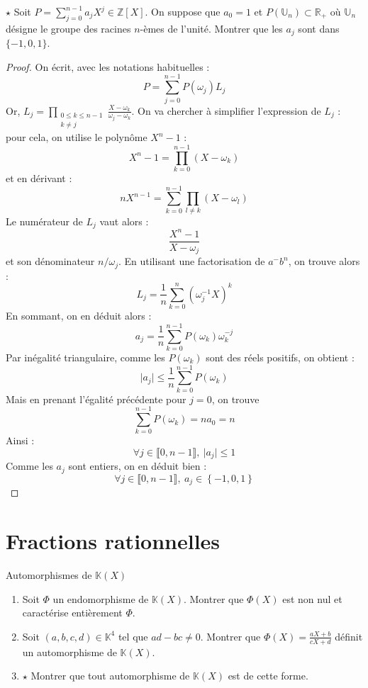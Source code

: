 \documentclass[french,a4paper]{article}
\newcommand{\Z}{\mathbb{Z}}
\newcommand{\R}{\mathbb{R}}
\newcommand{\K}{\mathbb{K}}
\newcommand{\U}{\mathbb{U}}
\newcommand{\inv}{^{-1}}
\theoremstyle{plain}
\theoremstyle{definition}
\theoremstyle{remark}
\begin{document}
\begin{ex}{$\star$}
	Soit $P=\displaystyle\sum_{j=0}^{n-1}a_jX^j\in\Z[X]$. On suppose que $a_0=1$ et $P(\U_n)\subset\R_+$ où $\U_n$ désigne le groupe des racines $n$-èmes de l'unité. Montrer que les $a_j$ sont dans $\{-1,0,1\}$.
\end{ex}
\begin{proof}
	On écrit, avec les notations habituelles : $$P=\sum_{j=0}^{n-1}P(\omega_j)L_j$$ Or, $L_j=\displaystyle\prod_{\substack{0\leqslant k\leqslant n-1\\ k\ne j}}\frac{X-\omega_k}{\omega_j-\omega_k}$. On va chercher à simplifier l'expression de $L_j$ : pour cela, on utilise le polynôme $X^n-1$ : $$X^n-1=\prod_{k=0}^{n-1}(X-\omega_k)$$ et en dérivant : $$nX^{n-1}=\sum_{k=0}^{n-1}\prod_{l\ne k}(X-\omega_l)$$ Le numérateur de $L_j$ vaut alors : $$\frac{X^n-1}{X-\omega_j}$$ et son dénominateur $n/\omega_j$. En utilisant une factorisation de $a^-b^n$, on trouve alors : $$L_j=\frac{1}{n}\sum_{k=0}^{n}(\omega_j\inv X)^k$$ En sommant, on en déduit alors : $$a_j=\frac{1}{n}\sum_{k=0}^{n-1}P(\omega_k)\omega_k^{-j}$$ Par inégalité triangulaire, comme les $P(\omega_k)$ sont des réels positifs, on obtient : $$\lvert a_j\rvert\leqslant\frac{1}{n}\sum_{k=0}^{n-1}P(\omega_k)$$ Mais en prenant l'égalité précédente pour $j=0$, on trouve $$\sum_{k=0}^{n-1}P(\omega_k)=na_0=n$$ Ainsi : $$\forall j\in\llbracket0,n-1\rrbracket,\ \lvert a_j\rvert\leqslant 1$$ Comme les $a_j$ sont entiers, on en déduit bien : $$\forall j\in\llbracket0,n-1\rrbracket,\ a_j\in\left\{-1,0,1\right\}$$
\end{proof}

\section{Fractions rationnelles}

\begin{ex}{Automorphismes de $\K(X)$}
	\begin{enumerate}
		\item Soit $\Phi$ un endomorphisme de $\K(X)$. Montrer que $\Phi(X)$ est non nul et caractérise entièrement $\Phi$.
		\item Soit $(a,b,c,d)\in\K^4$ tel que $ad-bc\ne 0$. Montrer que $\Phi(X)=\displaystyle\frac{aX+b}{cX+d}$ définit un automorphisme de $\K(X)$.
		\item $\star$ Montrer que tout automorphisme de $\K(X)$ est de cette forme.
	\end{enumerate}
\end{ex}
\end{document}
